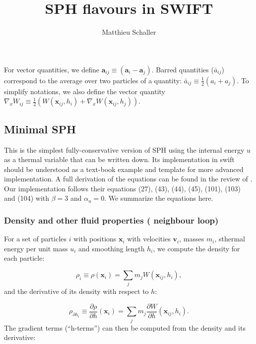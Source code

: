 \documentclass[fleqn, usenatbib, useAMS, a4paper]{mnras}
\title{SPH flavours in SWIFT}
\author{Matthieu Schaller}
\newcommand{\swift}{{\sc swift}\xspace}
\newcommand{\dd}[2]{\frac{\partial #1}{\partial #2}}
\renewcommand{\vec}[1]{{\mathbf{#1}}}
\newcommand{\Wij}{\overline{\nabla_xW_{ij}}}
\begin{document}
\maketitle

For vector quantities, we define $\vec{a}_{ij} \equiv (\vec{a}_i -
\vec{a}_j)$. Barred quantities ($\bar a_{ij}$) correspond to the
average over two particles of a quantity: $\bar a_{ij} \equiv
\frac{1}{2}(a_i + a_j)$. To simplify notations, we also define the
vector quantity $\Wij \equiv \frac{1}{2}\left(W(\vec{x}_{ij}, h_i) +
\nabla_x W(\vec{x}_{ij},h_j)\right)$.

\subsection{Minimal SPH}
\label{sec:sph:minimal}

This is the simplest fully-conservative version of SPH using the
internal energy $u$ as a thermal variable that can be written
down. Its implementation in \swift should be understood as a text-book
example and template for more advanced implementation. A full
derivation of the equations can be found in the review of
\cite{Price2012}. Our implementation follows their equations (27), (43),
(44), (45), (101), (103) and (104) with $\beta=3$ and $\alpha_u=0$. We
summarize the equations here. 

\subsubsection{Density and other fluid properties ( neighbour loop)}

For a set of particles $i$ with positions $\vec{x}_i$ with velocities
$\vec{v}_i$, masses $m_i$, sthermal energy per unit mass $u_i$ and
smoothing length $h_i$, we compute the density for each particle:

\begin{equation}
  \rho_i \equiv \rho(\vec{x}_i) = \sum_j m_j W(\vec{x}_{ij}, h_i),
  \label{eq:sph:minimal:rho}
\end{equation}
and the derivative of its density with respect to $h$:

\begin{equation}
    \label{eq:sph:minimal:rho_dh}
  \rho_{\partial h_i} \equiv \dd{\rho}{h}(\vec{x}_i) = \sum_j m_j \dd{W}{h}(\vec{x}_{ij}
  , h_i).
\end{equation}
The gradient terms (``h-terms'') can then be computed from the density
and its derivative:
\end{document}

